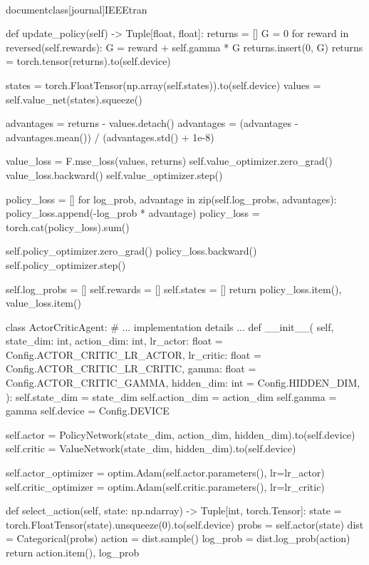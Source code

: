\\documentclass[journal]{IEEEtran}
\begin{document}
    def update_policy(self) -> Tuple[float, float]:
        returns = []
        G = 0
        for reward in reversed(self.rewards):
            G = reward + self.gamma * G
            returns.insert(0, G)
        returns = torch.tensor(returns).to(self.device)

        states = torch.FloatTensor(np.array(self.states)).to(self.device)
        values = self.value_net(states).squeeze()

        advantages = returns - values.detach()
        advantages = (advantages - advantages.mean()) / (advantages.std() + 1e-8)

        value_loss = F.mse_loss(values, returns)
        self.value_optimizer.zero_grad()
        value_loss.backward()
        self.value_optimizer.step()

        policy_loss = []
        for log_prob, advantage in zip(self.log_probs, advantages):
            policy_loss.append(-log_prob * advantage)
        policy_loss = torch.cat(policy_loss).sum()

        self.policy_optimizer.zero_grad()
        policy_loss.backward()
        self.policy_optimizer.step()

        self.log_probs = []
        self.rewards = []
        self.states = []
        return policy_loss.item(), value_loss.item()


class ActorCriticAgent:
    # ... implementation details ...
    def __init__(
        self,
        state_dim: int,
        action_dim: int,
        lr_actor: float = Config.ACTOR_CRITIC_LR_ACTOR,
        lr_critic: float = Config.ACTOR_CRITIC_LR_CRITIC,
        gamma: float = Config.ACTOR_CRITIC_GAMMA,
        hidden_dim: int = Config.HIDDEN_DIM,
    ):
        self.state_dim = state_dim
        self.action_dim = action_dim
        self.gamma = gamma
        self.device = Config.DEVICE

        self.actor = PolicyNetwork(state_dim, action_dim, hidden_dim).to(self.device)
        self.critic = ValueNetwork(state_dim, hidden_dim).to(self.device)

        self.actor_optimizer = optim.Adam(self.actor.parameters(), lr=lr_actor)
        self.critic_optimizer = optim.Adam(self.critic.parameters(), lr=lr_critic)

    def select_action(self, state: np.ndarray) -> Tuple[int, torch.Tensor]:
        state = torch.FloatTensor(state).unsqueeze(0).to(self.device)
        probs = self.actor(state)
        dist = Categorical(probs)
        action = dist.sample()
        log_prob = dist.log_prob(action)
        return action.item(), log_prob
\end{document}
